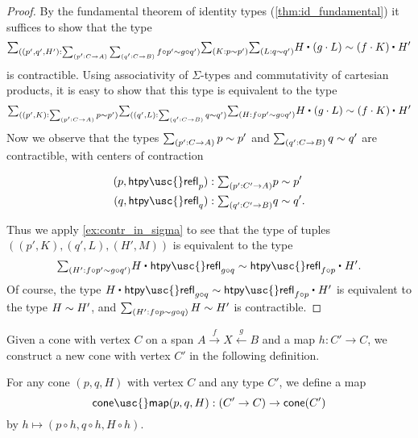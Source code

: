 \begin{proof}
By the fundamental theorem of identity types (\cref{thm:id_fundamental}) it suffices to show that the type
\begin{equation*}
  \sm{(p',q',H'):\sm{p':C\to A}{q':C\to B}f\circ p'\htpy g \circ q'}{K:p\htpy p'}{L:q\htpy q'} \ct{H}{(g\cdot L)} \htpy \ct{(f\cdot K)}{H'}
\end{equation*}
is contractible. Using associativity of $\Sigma$-types and commutativity of cartesian products, it is easy to show that this type is equivalent to the type
\begin{equation*}
  \sm{(p',K):\sm{p':C\to A}p\htpy p'}\sm{(q',L):\sm{q':C\to B}q\htpy q'}\sm{H:f\circ p'\htpy g \circ q'}\ct{H}{(g\cdot L)} \htpy \ct{(f\cdot K)}{H'}
\end{equation*}
Now we observe that the types $\sm{p':C\to A}p\htpy p'$ and $\sm{q':C\to B}q\htpy q'$ are contractible, with centers of contraction
\begin{samepage}
\begin{align*}
(p,\mathsf{htpy\usc{}refl}_p) & : \sm{p':C'\to A} p\htpy p' \\
(q,\mathsf{htpy\usc{}refl}_q) & : \sm{q':C'\to B} q\htpy q'.
\end{align*}%
\end{samepage}%
Thus we apply \cref{ex:contr_in_sigma} to see that the type of tuples $((p',K),(q',L),(H',M))$ is equivalent to the type
\begin{equation*}
\sm{H':f\circ p'\htpy g\circ q'} \ct{H}{\mathsf{htpy\usc{}refl}_{g\circ q}}\htpy \ct{\mathsf{htpy\usc{}refl}_{f\circ p}}{H'}.
\end{equation*}
Of course, the type $\ct{H}{\mathsf{htpy\usc{}refl}_{g\circ q}}\htpy \ct{\mathsf{htpy\usc{}refl}_{f\circ p}}{H'}$ is equivalent to the type $H\sim H'$, and $\sm{H':f\circ p\htpy g\circ q} H\htpy H'$ is contractible.
\end{proof}

Given a cone with vertex $C$ on a span $A\stackrel{f}{\rightarrow} X \stackrel{g}{\leftarrow} B$ and a map $h:C'\to C$, we construct a new cone with vertex $C'$ in the following definition.

\begin{defn}
For any cone $(p,q,H)$ with vertex $C$ and any type $C'$, we define a map
\begin{equation*}
\mathsf{cone\usc{}map}(p,q,H):(C'\to C)\to\mathsf{cone}(C')
\end{equation*}
by $h\mapsto (p\circ h,q\circ h,H\circ h)$. 
\end{defn}

